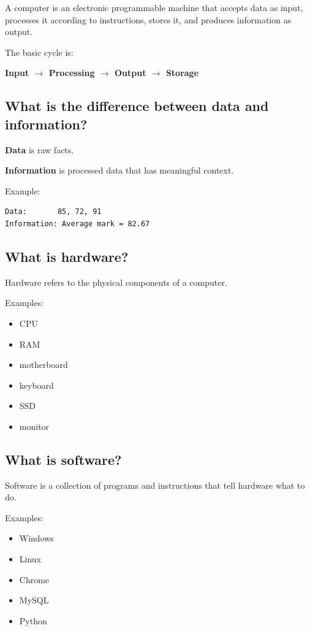 A computer is an electronic programmable machine that accepts data as input, processes it according to instructions, stores it, and produces information as output.

The basic cycle is:

\textbf{Input $\rightarrow$ Processing $\rightarrow$ Output $\rightarrow$ Storage}

\medskip

\subsection{What is the difference between data and information?}

\textbf{Data} is raw facts.

\textbf{Information} is processed data that has meaningful context.

Example:

\begin{lstlisting}
Data:       85, 72, 91
Information: Average mark = 82.67
\end{lstlisting}

\medskip

\subsection{What is hardware?}

Hardware refers to the physical components of a computer.

Examples:

\begin{itemize}
  \item CPU
  \item RAM
  \item motherboard
  \item keyboard
  \item SSD
  \item monitor
\end{itemize}

\medskip

\subsection{What is software?}

Software is a collection of programs and instructions that tell hardware what to do.

Examples:

\begin{itemize}
  \item Windows
  \item Linux
  \item Chrome
  \item MySQL
  \item Python
\end{itemize}

